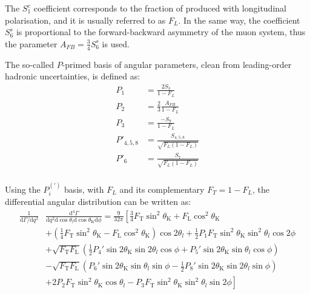 The $S_1^c$ coefficient corresponds to the fraction of \Ks produced with longitudinal polarisation, and it is usually referred to as $F_L$.
In the same way, the coefficient $S_6^s$ is proportional to the forward-backward asymmetry of the muon system, thus the parameter $A_{FB}=\frac{3}{4}S_6^s$ is used.

The so-called $P$-primed basis of angular parameters, clean from leading-order hadronic uncertainties, is defined as:
\begin{equation}\label{eq:defPPrime}
  \begin{split}
    P_1 &= \frac{2S_3}{1-F_L}\\
    P_2 &= \frac{2}{3}\frac{A_{FB}}{1-F_L}\\
    P_3 &= \frac{-S_9}{1-F_L}\\
    P'_{4,5,8} &= \frac{S_{4,5,8}}{\sqrt{F_L(1-F_L)}}\\
    P'_6 &= \frac{S_7}{\sqrt{F_L(1-F_L)}}\\
  \end{split}
\end{equation}

Using the $P_i^{(\prime)}$ basis, with $F_L$ and its complementary $F_T=1-F_L$, the differential angular distribution can be written as:
\begin{equation} \label{eq:Angular}
  \begin{split}
    \frac{1}{\mathrm{d}\Gamma/\mathrm{d}q^2}&\frac{\mathrm{d}^4\Gamma}{\mathrm{d}q^2 \mathrm{d}\cos\theta_l \mathrm{d}\cos\theta_\mathrm{K} \mathrm{d}\phi} =\frac{9}{32\pi}\left[\frac{3}{4}F_\mathrm{T}\sin^2\theta_\mathrm{K} + F_\mathrm{L}\cos^2\theta_\mathrm{K} \right.\\
      &\left.+\left(\frac{1}{4}F_\mathrm{T}\sin^2\theta_\mathrm{K}-F_\mathrm{L}\cos^2\theta_\mathrm{K}\right)\cos2\theta_l+\frac{1}{2}P_1F_\mathrm{T}\sin^2\theta_\mathrm{K}\sin^2\theta_l\cos 2\phi \right.\\
      &+\sqrt{F_\mathrm{T}F_\mathrm{L}}\left(\frac{1}{2}P_4'\sin2\theta_\mathrm{K}\sin2\theta_l\cos\phi+P_5'\sin2\theta_\mathrm{K}\sin\theta_l\cos\phi \right)\\
      &-\sqrt{F_\mathrm{T}F_\mathrm{L}}\left(P_6'\sin2\theta_\mathrm{K}\sin\theta_l\sin\phi-\frac{1}{2}P_8'\sin2\theta_\mathrm{K}\sin2\theta_l\sin\phi \right)\\
      &\left.+2P_2F_\mathrm{T}\sin^2\theta_\mathrm{K}\cos\theta_l-P_3F_\mathrm{T}\sin^2\theta_\mathrm{K}\sin^2\theta_l\sin2\phi \right]
  \end{split}
\end{equation}


